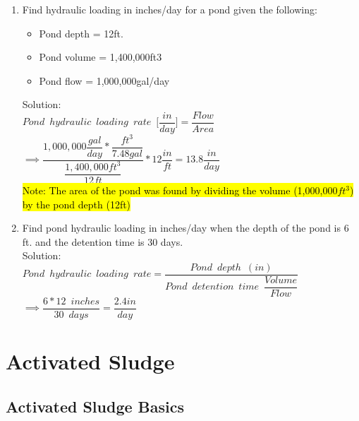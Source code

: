 \begin{enumerate}

\item Find hydraulic loading in inches/day for a pond given the following:
\begin{itemize}
\item Pond depth = 12ft.
\item Pond volume = 1,400,000ft3
\item Pond flow = 1,000,000gal/day
\end{itemize}
Solution:\\
$Pond \enspace hydraulic \enspace loading \enspace rate \enspace \Bigg[\dfrac{in}{day}\Bigg]=\dfrac{Flow}{Area}$\\
$ \implies\dfrac{1,000,000\dfrac{gal}{day}*\dfrac{ft^3 }{7.48gal}}{\dfrac{1,400,000ft^3}{12ft}}*12\dfrac{in}{ft}=\boxed{13.8\dfrac{in}{day}}$\\
\vspace{0.3cm}
\hl{Note:  The area of the pond was found by dividing the volume (1,000,000$ft^3$) by the pond depth (12ft)}
\vspace{0.3cm}

\item Find pond hydraulic loading in inches/day when the depth of the pond is 6 ft. and the detention time is 30 days.\\
Solution:\\



$Pond \enspace hydraulic \enspace loading \enspace rate=\dfrac{Pond \enspace depth \enspace (in)}{Pond \enspace detention  \enspace time \enspace \dfrac{Volume}{Flow}}$\\
$\implies \dfrac{6*12 \enspace inches}{30 \enspace days}=\boxed{\dfrac{2.4in}{day}}$
\end{enumerate}





\chapter{Activated Sludge}


\section{Activated Sludge Basics}

